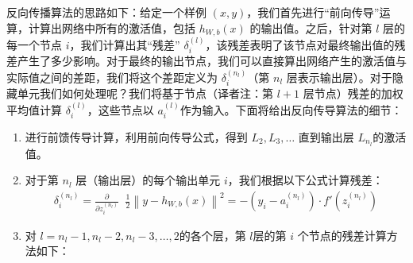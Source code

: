 反向传播算法的思路如下：给定一个样例 $ (x,y)$，我们首先进行“前向传导”运算，计算出网络中所有的激活值，包括 $ h_{W,b}(x)$ 的输出值。之后，针对第 $ l$ 层的每一个节点 $ i$，我们计算出其“残差” $ \delta^{(l)}_i$，该残差表明了该节点对最终输出值的残差产生了多少影响。对于最终的输出节点，我们可以直接算出网络产生的激活值与实际值之间的差距，我们将这个差距定义为 $ \delta^{(n_l)}_i $（第 $ n_l$ 层表示输出层）。对于隐藏单元我们如何处理呢？我们将基于节点（译者注：第 $ l+1$ 层节点）残差的加权平均值计算 $ \delta^{(l)}_i$，这些节点以 $ a^{(l)}_i $作为输入。下面将给出反向传导算法的细节：
\begin{enumerate}
\item
进行前馈传导计算，利用前向传导公式，得到 $ L_2, L_3, \ldots $ 直到输出层 $ L_{n_l} $的激活值。
\item
对于第 $ n_l$ 层（输出层）的每个输出单元 $ i$，我们根据以下公式计算残差：
\begin{align}
\delta^{(n_l)}_i
= \frac{\partial}{\partial z^{(n_l)}_i} \;\;
        \frac{1}{2} \left\|y - h_{W,b}(x)\right\|^2 = - (y_i - a^{(n_l)}_i) \cdot f'(z^{(n_l)}_i)
\nonumber \end{align}
\item
对 $ l = n_l-1, n_l-2, n_l-3, \ldots, 2 $的各个层，第 $ l $层的第 $ i$ 个节点的残差计算方法如下：
 

\end{enumerate}
